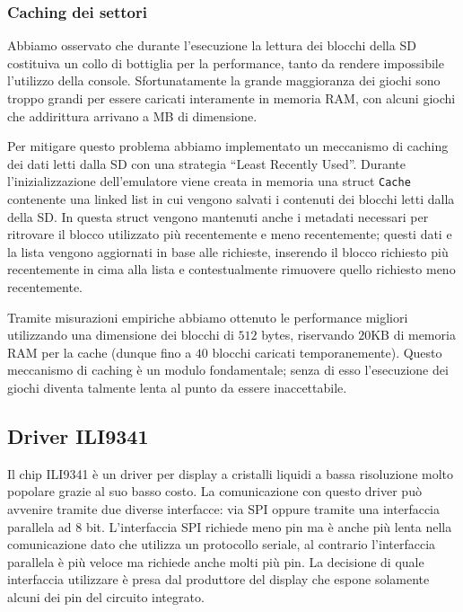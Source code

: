 \documentclass[hidelinks,12pt]{article}
\begin{document}
\subsubsection{Caching dei settori}
Abbiamo osservato che durante l'esecuzione la lettura dei blocchi della SD
costituiva un collo di bottiglia per la performance, tanto da rendere
impossibile l'utilizzo della console. Sfortunatamente la grande maggioranza
dei giochi sono troppo grandi per essere caricati interamente in memoria RAM,
con alcuni giochi che addirittura arrivano a MB di dimensione.

Per mitigare questo problema abbiamo implementato un meccanismo di caching dei
dati letti dalla SD con una strategia ``Least Recently Used''.
Durante l'inizializzazione dell'emulatore viene creata in memoria una struct
\texttt{Cache} contenente una linked list in cui vengono salvati i contenuti
dei blocchi letti dalla della SD.
In questa struct vengono mantenuti anche i metadati necessari per
ritrovare il blocco utilizzato più recentemente e meno recentemente; questi dati
e la lista vengono aggiornati in base alle richieste, inserendo il blocco
richiesto più recentemente in cima alla lista e contestualmente rimuovere quello
richiesto meno recentemente.

Tramite misurazioni empiriche abbiamo ottenuto le performance migliori
utilizzando una dimensione dei blocchi di $512$ bytes, riservando $20$KB di
memoria RAM per la cache (dunque fino a $40$ blocchi caricati temporanemente).
Questo meccanismo di caching è un modulo fondamentale; senza di esso l'esecuzione
dei giochi diventa talmente lenta al punto da essere inaccettabile.


\subsection{Driver ILI9341}
Il chip ILI9341 è un driver per display a cristalli liquidi a bassa risoluzione
molto popolare grazie al suo basso costo. La comunicazione con questo driver
può avvenire tramite due diverse interfacce: via SPI oppure tramite una
interfaccia parallela ad 8 bit.
L'interfaccia SPI richiede meno pin ma è anche più lenta nella comunicazione
dato che utilizza un protocollo seriale, al contrario l'interfaccia parallela
è più veloce ma richiede anche molti più pin.
La decisione di quale interfaccia utilizzare è presa dal produttore del
display che espone solamente alcuni dei pin del circuito integrato.
\end{document}
